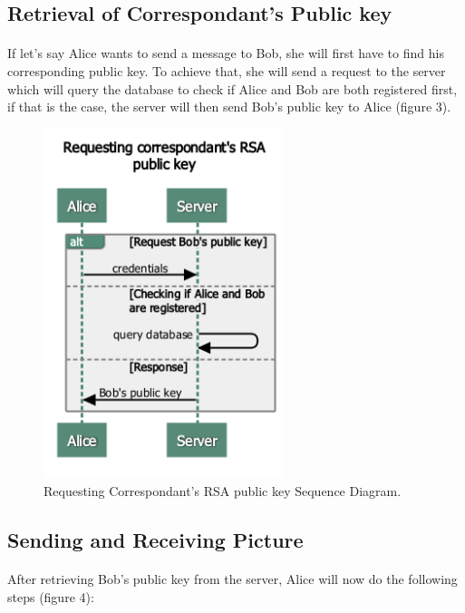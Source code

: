 	  \subsection{Retrieval of Correspondant's Public key}
	  \paragraph{}
	  
	    If let's say Alice wants to send a message to Bob, she will first have to find his corresponding public key. To achieve that, she will send a request to the server which will query the database to check if Alice and Bob are both registered first, if that is the case, the server will then send Bob's public key to Alice (figure 3).
	    
	    \begin{figure}[H]
	      \centering
	      \includegraphics[width=7cm]{images/architecture/requestingcorrespondant'sRSApublickey}
	      \caption{Requesting Correspondant's RSA public key Sequence Diagram.}
	    \end{figure}
	    
	    
	    \subsection{Sending and Receiving Picture}
	    \paragraph{}
	    
	    After retrieving Bob's public key from the server, Alice will now do the following steps (figure 4):
	    

